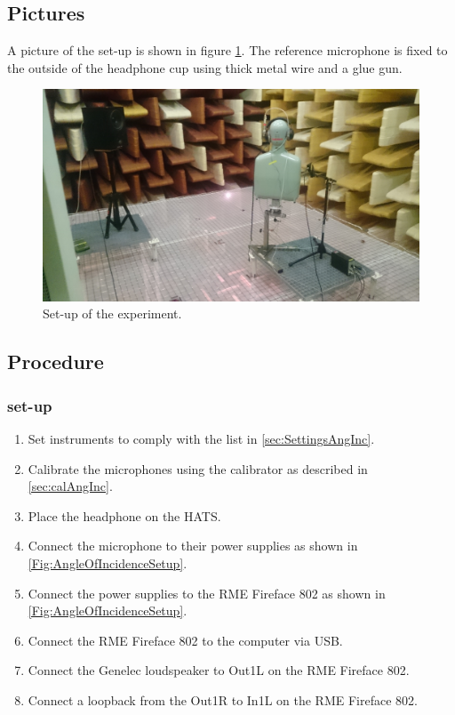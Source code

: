 \subsection{Pictures}
A picture of the set-up is shown in figure \ref{AngIncidenceSetup}. The reference microphone is fixed to the outside of the headphone cup using thick metal wire and a glue gun.  
\begin{figure}[H]
	\includegraphics[width=\textwidth]{../Journal/Experiments/AngleOfIncidence/AngInSetup.jpg}
	\caption{Set-up of the experiment.}
	\label{AngIncidenceSetup}	
\end{figure}


\subsection{Procedure}
\subsubsection{set-up}
\begin{enumerate}
	\item Set instruments to comply with the list in \ref{sec:SettingsAngInc}.
	\item Calibrate the microphones using the calibrator as described in \autoref{sec:calAngInc}.
	\item Place the headphone on the HATS.
	\item Connect the microphone to their power supplies as shown in \autoref{Fig:AngleOfIncidenceSetup}. 
	\item Connect the power supplies to the RME Fireface 802 as shown in \autoref{Fig:AngleOfIncidenceSetup}. 
	\item Connect the RME Fireface 802 to the computer via USB.
	\item Connect the Genelec loudspeaker to Out1L on the RME Fireface 802.
	\item Connect a loopback from the Out1R to In1L on the RME Fireface 802.
\end{enumerate}


